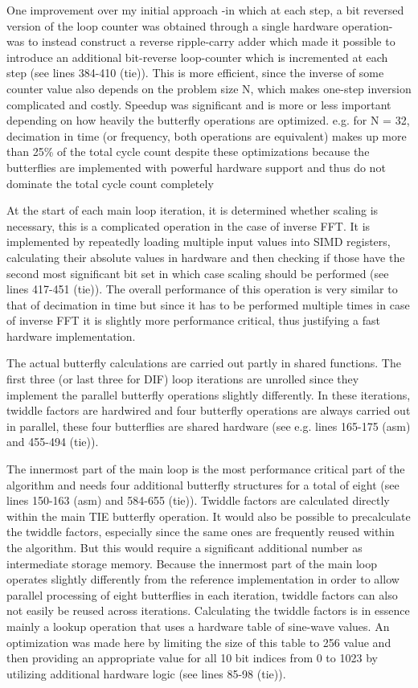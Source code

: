 \documentclass[ngerman, cd=lightcolor]{tudscrreprt}
\begin{document}
One improvement over my initial approach -in which at each step, a bit reversed
version of the loop counter was obtained through a single hardware operation-
was to instead construct a reverse ripple-carry adder which made it possible to
introduce an additional bit-reverse loop-counter which is incremented at each
step (see lines 384-410 (tie)). This is more efficient, since the inverse of
some counter value also depends on the problem size N, which makes one-step
inversion complicated and costly. Speedup was significant and is more or less
important depending on how heavily the butterfly operations are optimized. e.g.
for N = 32, decimation in time (or frequency, both operations are equivalent)
makes up more than 25\% of the total cycle count despite these optimizations
because the butterflies are implemented with powerful hardware support and thus
do not dominate the total cycle count completely

At the start of each main loop iteration, it is determined whether scaling is
necessary, this is a complicated operation in the case of inverse FFT. It is
implemented by repeatedly loading multiple input values into SIMD registers,
calculating their absolute values in hardware and then checking if those have
the second most significant bit set in which case scaling should be performed
(see lines 417-451 (tie)). The overall performance of this operation is very
similar to that of decimation in time but since it has to be performed multiple
times in case of inverse FFT it is slightly more performance critical, thus
justifying a fast hardware implementation.

The actual butterfly calculations are carried out partly in shared functions.
The first three (or last three for DIF) loop iterations are unrolled since they
implement the parallel butterfly operations slightly differently. In these
iterations, twiddle factors are hardwired and four butterfly operations are
always carried out in parallel, these four butterflies are shared hardware (see
e.g. lines 165-175 (asm) and 455-494 (tie)).

The innermost part of the main loop is the most performance critical part of
the algorithm and needs four additional butterfly structures for a total of
eight (see lines 150-163 (asm) and 584-655 (tie)). Twiddle factors are
calculated directly within the main TIE butterfly operation. It would also be
possible to precalculate the twiddle factors, especially since the same ones
are frequently reused within the algorithm.  But this would require a
significant additional number as intermediate storage memory. Because the
innermost part of the main loop operates slightly differently from the
reference implementation in order to allow parallel processing of eight
butterflies in each iteration, twiddle factors can also not easily be reused
across iterations. Calculating the twiddle factors is in essence mainly a
lookup operation that uses a hardware table of sine-wave values. An
optimization was made here by limiting the size of this table to 256 value and
then providing an appropriate value for all 10 bit indices from 0 to 1023 by
utilizing additional hardware logic (see lines 85-98 (tie)).
\end{document}
